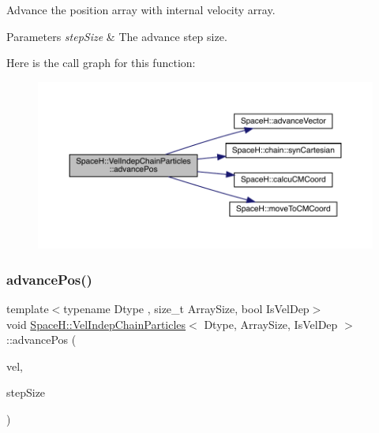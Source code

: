 Advance the position array with internal velocity array. 


\begin{DoxyParams}{Parameters}
{\em step\+Size} & The advance step size. \\
\hline
\end{DoxyParams}
Here is the call graph for this function\+:
\nopagebreak
\begin{figure}[H]
\begin{center}
\leavevmode
\includegraphics[width=350pt]{class_space_h_1_1_vel_indep_chain_particles_a647d4861878b28d79b6aab00de12ab8d_cgraph}
\end{center}
\end{figure}
\mbox{\label{class_space_h_1_1_vel_indep_chain_particles_ae71e70b6374f8326b5ffb62d06284942}} 
\subsubsection{\texorpdfstring{advance\+Pos()}{advancePos()}\hspace{0.1cm}{\footnotesize\ttfamily [3/4]}}
{\footnotesize\ttfamily template$<$typename Dtype , size\+\_\+t Array\+Size, bool Is\+Vel\+Dep$>$ \\
void \mbox{\hyperlink{class_space_h_1_1_vel_indep_chain_particles}{Space\+H\+::\+Vel\+Indep\+Chain\+Particles}}$<$ Dtype, Array\+Size, Is\+Vel\+Dep $>$\+::advance\+Pos (\begin{DoxyParamCaption}\item[{const \mbox{\hyperlink{class_space_h_1_1_vel_indep_particles_aa9983058940249df8b00fa800e8cbad2}{Vector\+Array}} \&}]{vel,  }\item[{\mbox{\hyperlink{class_space_h_1_1_vel_indep_particles_aeb47d8131b30ed790320ff634f0d6af1}{Scalar}}}]{step\+Size }\end{DoxyParamCaption})\hspace{0.3cm}{\ttfamily [inline]}}



